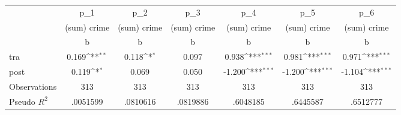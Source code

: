 {
\def\sym#1{\ifmmode^{#1}\else\(^{#1}\)\fi}
\begin{tabular}{l*{6}{c}}
\toprule
                    &         p\_1         &         p\_2         &         p\_3         &         p\_4         &         p\_5         &         p\_6         \\
                    & (sum) crime         & (sum) crime         & (sum) crime         & (sum) crime         & (sum) crime         & (sum) crime         \\
                    &           b         &           b         &           b         &           b         &           b         &           b         \\
\midrule
tra                 &       0.169\sym{**} &       0.118\sym{*}  &       0.097         &       0.938\sym{***}&       0.981\sym{***}&       0.971\sym{***}\\
post                &       0.119\sym{*}  &       0.069         &       0.050         &      -1.200\sym{***}&      -1.200\sym{***}&      -1.104\sym{***}\\
\midrule
Observations        &         313         &         313         &         313         &         313         &         313         &         313         \\
Pseudo \(R^{2}\)    &    .0051599         &    .0810616         &    .0819886         &    .6048185         &    .6445587         &    .6512777         \\
\bottomrule
\end{tabular}
}
